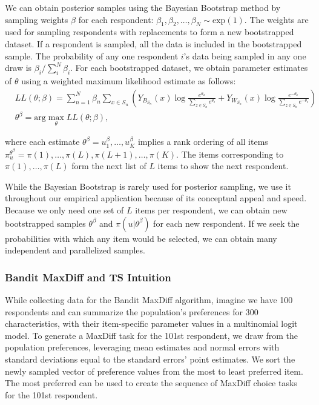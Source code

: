 \documentclass[nonblindrev]{informs3}
\newcommand{\ts}{\textbf{TS} }
\newcommand{\numperset}{L}
\begin{document}
We can obtain posterior samples using the Bayesian Bootstrap method by sampling weights $\beta$ for each respondent: $\beta_1,\beta_2,\ldots,\beta_N \sim \text{exp}(1)$. The weights are used for sampling respondents with replacements to form a new bootstrapped dataset. If a respondent is sampled, all the data is included in the bootstrapped sample. The probability of any one respondent $i$'s data being sampled in any one draw is $\beta_i / \sum_{i}^{N}\beta_i$.  For each bootstrapped dataset, we obtain parameter estimates of $\theta$ using a weighted  maximum likelihood estimate as follows:
\begin{align}
&LL(\theta;\beta)=\sum_{n=1}^N \beta_n
\sum_{x \in S_n} 
	\left(
		Y_{B_{S_n}}(x)
		\log{\frac{e^{\theta_x}}{\sum_{z\in S_n} e^{\theta_z}}} 
		+ 
		Y_{W_{S_n}}(x)
		\log{\frac{e^{-\theta_x}}{\sum_{z\in S_n} e^{-\theta_z}}}
	\right) \\
&\theta^\beta = \text{arg}\max_{\theta} LL(\theta;\beta) ,
\end{align}

where each estimate $\theta^\beta = u_1^\beta, \ldots, u_K^\beta$ implies a rank ordering of all items $\pi_{u}^{\theta^\beta} = \pi(1),\ldots,\pi(\numperset),\pi(\numperset+1),\ldots,\pi(K)$. The items corresponding to $\pi(1),\ldots,\pi(\numperset)$ form the next list of $\numperset$ items to show the next respondent. 

While the Bayesian Bootstrap is rarely used for posterior sampling, we use it throughout our empirical application because of its conceptual appeal and speed. Because we only need one set of $\numperset$ items per respondent, we can obtain new bootstrapped samples $\theta^{\beta}$ and $\pi(u|\theta^\beta)$ for each new respondent. If we seek the probabilities with which any item would be selected, we can obtain many independent and parallelized samples. 

\subsubsection{Bandit MaxDiff and \ts Intuition }

While collecting data for the Bandit MaxDiff algorithm, imagine we have 100 respondents and can summarize the population's preferences for 300 characteristics, with their item-specific parameter values in a multinomial logit model. To generate a MaxDiff task for the 101st respondent, we draw from the population preferences, leveraging mean estimates and normal errors with standard deviations equal to the standard errors' point estimates. We sort the newly sampled vector of preference values from the most to least preferred item. The most preferred can be used to create the sequence of MaxDiff choice tasks for the 101st respondent.
\end{document}
